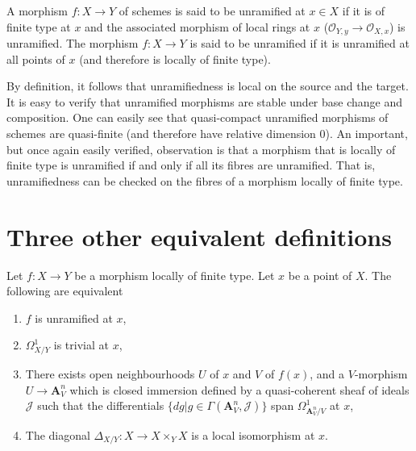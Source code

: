\begin{definition}
\label{definition-unramified-schemes}
A morphism $f:X \to Y$ of schemes is said to be unramified at $x \in X$ if it
is of finite type at $x$ and the associated morphism of local rings at $x$
($\mathcal{O}_{Y,y} \to \mathcal{O}_{X,x}$) is unramified. The morphism $f:X 
\to Y$ is said to
be unramified if it is unramified at all points of $x$ (and therefore is
locally of finite type).
\end{definition}

\noindent
By definition, it follows that unramifiedness is local on the source and the
target. It is easy to verify that unramified morphisms are stable under
base change and composition. One can easily see that quasi-compact unramified
morphisms of schemes are quasi-finite (and therefore have relative dimension
$0$). An important, but once again easily verified, observation is that a
morphism that is locally of finite type is unramified if and only if all its
fibres are unramified. That is, unramifiedness can be checked on the fibres
of a morphism locally of finite type.

\section{Three other equivalent definitions}
\label{section-three-other}

\begin{theorem}
\label{theorem-unramified-equivalence}
Let $f:X \to Y$ be a morphism locally of finite type. Let $x$ be a point of
$X$. The following are equivalent
\begin{enumerate}
\item $f$ is unramified at $x$,
\item $\Omega^1_{X/Y}$ is trivial at $x$,
\item There exists open neighbourhoods $U$ of $x$ and $V$ of $f(x)$, and a
$V$-morphism $U \to \mathbf{A}^n_V$ which is closed immersion defined by a
quasi-coherent sheaf of ideals $\mathcal{J}$ such that the differentials
$\{dg | g \in \Gamma(\mathbf{A}^n_V,\mathcal{J})\}$ span 
$\Omega^1_{\mathbf{A}^n_V/V}$ at $x$,
\item The diagonal $\Delta_{X/Y}:X \to X \times_Y X$ is a local isomorphism at
$x$.
\end{enumerate}
\end{theorem}

